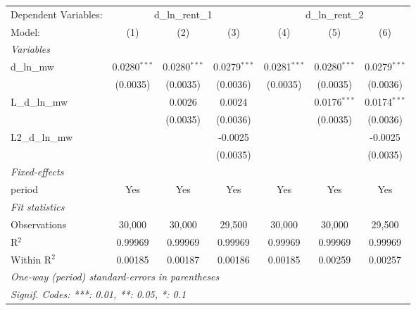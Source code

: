 \begin{tabular}{lcccccc}
\tabularnewline\toprule\toprule
Dependent Variables:&\multicolumn{3}{c}{d\_ln\_rent\_1}&\multicolumn{3}{c}{d\_ln\_rent\_2}\\
Model:&(1) & (2) & (3) & (4) & (5) & (6)\\
\midrule
\emph{Variables}&  & & & & & \\
d\_ln\_mw&0.0280$^{***}$&0.0280$^{***}$&0.0279$^{***}$&0.0281$^{***}$&0.0280$^{***}$&0.0279$^{***}$\\
  &(0.0035)&(0.0035)&(0.0036)&(0.0035)&(0.0035)&(0.0036)\\
L\_d\_ln\_mw&  &0.0026&0.0024&  &0.0176$^{***}$&0.0174$^{***}$\\
  &  &(0.0035)&(0.0036)&  &(0.0035)&(0.0036)\\
L2\_d\_ln\_mw&  &  &-0.0025&  &  &-0.0025\\
  &  &  &(0.0035)&  &  &(0.0035)\\
\midrule
\emph{Fixed-effects}&  & & & & & \\
period&Yes&Yes&Yes&Yes&Yes&Yes\\
\midrule
\emph{Fit statistics}&  & & & & & \\
Observations& 30,000&30,000&29,500&30,000&30,000&29,500\\
R$^2$ & 0.99969&0.99969&0.99969&0.99969&0.99969&0.99969\\
Within R$^2$ & 0.00185&0.00187&0.00186&0.00185&0.00259&0.00257\\
\bottomrule\bottomrule
\multicolumn{7}{l}{\emph{One-way (period) standard-errors in parentheses}}\\
\multicolumn{7}{l}{\emph{Signif. Codes: ***: 0.01, **: 0.05, *: 0.1}}\\
\end{tabular}
